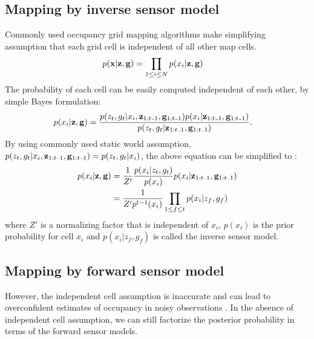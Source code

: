 \documentclass[letterpaper, 10 pt, conference]{ieeeconf} %
\begin{document}
\subsection{Mapping by inverse sensor model}
Commonly used occupancy grid mapping algorithms
\cite{elfes1989using,moravec1988sensor,newcombe2011kinectfusion} make
simplifying assumption that each grid cell is independent of all other map
cells. 
\newcommand{\remaining}{\measurements_{\prevtime}, \poses_{\prevtime}}
\begin{align}
  p(\mathbf{x}|\mathbf{z}, \mathbf{g}) &= \prod_{1 \le i \le N} p(x_i|\mathbf{z}, \mathbf{g})
\end{align}
The probability of each cell can be easily computed independent of each other,
by simple Bayes formulation:
\begin{align}
  p(x_i|\measurements, \poses) &= \frac{p(\meas_t, \pose_t|x_i, \remaining)p(x_i|\remaining)}
                         {p(\meas_t, \pose_t|\remaining)}.
\end{align}
By using commonly used
static world assumption, $p(z_t, g_t|x_i, \remaining) = p(z_t, g_t|x_i)$, the
above equation can be simplified \cite{merali2013icra} to :
\begin{align}
 p(x_i|\measurements, \poses) 
 &= \frac{1}{Z'}\frac{p(x_i|\meas_t, \pose_t)}{p(x_i)}p(x_i|\remaining)\\
 &= \frac{1}{Z'p^{t-1}(x_i)}\prod_{1\le f \le t} p(x_i|\meas_f, \pose_f)
\end{align}
where $Z'$ is a normalizing factor that is independent of $x_i$, $p(x_i)$ is
the prior probability for cell $x_i$ and $p(x_i|z_f, g_f)$ is called the
inverse sensor model.

\subsection{Mapping by forward sensor model}
However, the independent cell assumption is inaccurate and can lead to
overconfident estimates of occupancy in noisy observations
\cite{thrun2003learning,merali2013icra}. In the absence of independent cell
assumption, we can still factorize the posterior probability in terms of the
forward sensor models.
\end{document}

